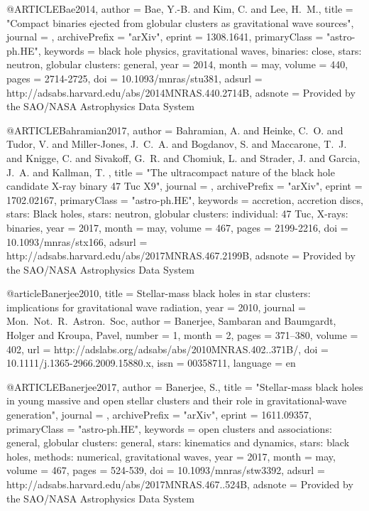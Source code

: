 \documentclass[twocolumn,tighten]{aastex63}
\begin{document}
{{{{{@ARTICLE{Bae2014,
   author = {{Bae}, Y.-B. and {Kim}, C. and {Lee}, H.~M.},
    title = "{Compact binaries ejected from globular clusters as gravitational wave sources}",
  journal = {\mnras},
archivePrefix = "arXiv",
   eprint = {1308.1641},
 primaryClass = "astro-ph.HE",
 keywords = {black hole physics, gravitational waves, binaries: close, stars: neutron, globular clusters: general},
     year = 2014,
    month = may,
   volume = 440,
    pages = {2714-2725},
      doi = {10.1093/mnras/stu381},
   adsurl = {http://adsabs.harvard.edu/abs/2014MNRAS.440.2714B},
  adsnote = {Provided by the SAO/NASA Astrophysics Data System}
}

@ARTICLE{Bahramian2017,
   author = {{Bahramian}, A. and {Heinke}, C.~O. and {Tudor}, V. and {Miller-Jones}, J.~C.~A. and 
	{Bogdanov}, S. and {Maccarone}, T.~J. and {Knigge}, C. and {Sivakoff}, G.~R. and 
	{Chomiuk}, L. and {Strader}, J. and {Garcia}, J.~A. and {Kallman}, T.
	},
    title = "{The ultracompact nature of the black hole candidate X-ray binary 47 Tuc X9}",
  journal = {\mnras},
archivePrefix = "arXiv",
   eprint = {1702.02167},
 primaryClass = "astro-ph.HE",
 keywords = {accretion, accretion discs, stars: Black holes, stars: neutron, globular clusters: individual: 47 Tuc, X-rays: binaries},
     year = 2017,
    month = may,
   volume = 467,
    pages = {2199-2216},
      doi = {10.1093/mnras/stx166},
   adsurl = {http://adsabs.harvard.edu/abs/2017MNRAS.467.2199B},
  adsnote = {Provided by the SAO/NASA Astrophysics Data System}
}

@article{Banerjee2010,
    title = {{Stellar-mass black holes in star clusters: implications for gravitational wave radiation}},
    year = {2010},
    journal = {Mon.~Not.~R.~Astron.~Soc},
    author = {Banerjee, Sambaran and Baumgardt, Holger and Kroupa, Pavel},
    number = {1},
    month = {2},
    pages = {371--380},
    volume = {402},
    url = {http://adslabs.org/adsabs/abs/2010MNRAS.402..371B/},
    doi = {10.1111/j.1365-2966.2009.15880.x},
    issn = {00358711},
    language = {en}
}

@ARTICLE{Banerjee2017,
   author = {{Banerjee}, S.},
    title = "{Stellar-mass black holes in young massive and open stellar clusters and their role in gravitational-wave generation}",
  journal = {\mnras},
archivePrefix = "arXiv",
   eprint = {1611.09357},
 primaryClass = "astro-ph.HE",
 keywords = {open clusters and associations: general, globular clusters: general, stars: kinematics and dynamics, stars: black holes, methods: numerical, gravitational waves},
     year = 2017,
    month = may,
   volume = 467,
    pages = {524-539},
      doi = {10.1093/mnras/stw3392},
   adsurl = {http://adsabs.harvard.edu/abs/2017MNRAS.467..524B},
  adsnote = {Provided by the SAO/NASA Astrophysics Data System}
}

}}}}}
\end{document}
